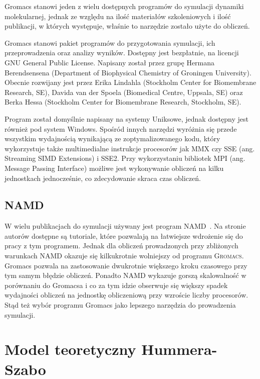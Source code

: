 Gromacs stanowi jeden z wielu dostępnych programów do symulacji dynamiki molekularnej, jednak ze względu na ilość materiałów szkoleniowych\cite{Gromacs_tut} i ilość publikacji, w których występuje, właśnie to narzędzie zostało użyte do obliczeń.

Gromacs stanowi pakiet programów do przygotowania symulacji, ich przeprowadzenia oraz analizy wyników. Dostępny jest bezpłatnie, na licencji GNU General Public License. Napisany został przez grupę Hermana Berendsensena (Department of Biophysical Chemistry of Groningen University). Obecnie rozwijany jest przez Erika Lindahla  (Stockholm Center for Biomembrane Research, SE), Davida van der Spoela (Biomedical Centre, Uppsala, SE) oraz Berka Hessa (Stockholm Center for Biomembrane Research, Stockholm, SE). 

Program został domyślnie napisany na systemy Uniksowe, jednak dostępny jest również pod system Windows. Spośród innych narzędzi wyróżnia się przede wszystkim wydajnością wynikającą ze zoptymalizowanego kodu, który wykorzystuje także multimedialne instrukcje procesorów jak MMX czy SSE (ang. Streaming SIMD Extensions) i SSE2. Przy wykorzystaniu bibliotek MPI (ang. Message Passing Interface) możliwe jest wykonywanie obliczeń na kilku jednostkach jednocześnie, co zdecydowanie skraca czas obliczeń. 

\subsection{NAMD}
W wielu publikacjach do symulacji używany jest program NAMD~\cite{NAMD}. Na stronie autorów \cite{namdtut} dostępne są tutoriale, które pozwalają na łatwiejsze wdrożenie się do pracy z tym programem. Jednak dla obliczeń prowadzonych przy zbliżonych warunkach NAMD okazuje się kilkukrotnie wolniejszy od programu \textsc{Gromacs}\cite{NAMD_sux}. Gromacs pozwala na zastosowanie dwukrotnie większego kroku czasowego przy tym samym błędzie obliczeń. Ponadto NAMD wykazuje gorszą skalowalność w porównaniu do Gromacsa i co za tym idzie obserwuje się większy spadek wydajności obliczeń na jednostkę obliczeniową przy wzroście liczby procesorów. Stąd też wybór programu Gromacs jako lepszego narzędzia do prowadzenia symulacji.

\section{Model teoretyczny Hummera-Szabo}


